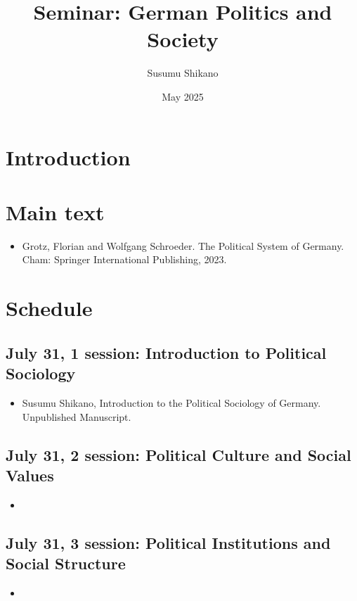 \documentclass[11p,a4]{article}
\title{Seminar: German Politics and Society}
\author{Susumu  Shikano}
\date{May 2025}
\begin{document}
\maketitle

\section{Introduction}

\section{Main text}

\begin{itemize}
    \item Grotz, Florian and Wolfgang Schroeder. The Political System of Germany. Cham: Springer International Publishing, 2023.
\end{itemize}

\section{Schedule}

\subsection*{July 31, 1 session: Introduction to Political Sociology}
				
				\begin{itemize}
				    \item Susumu Shikano, Introduction to the Political Sociology of Germany. Unpublished Manuscript.
				\end{itemize}
				
\subsection*{July 31, 2 session: Political Culture and Social Values}				

                \begin{itemize}
                    \item \citet{Pickel02012023}
                \end{itemize}
				
				
\subsection*{July 31, 3 session: Political Institutions and Social Structure}				
				\begin{itemize}
                    \item \cite{Schmidt02042016}
				\end{itemize}
				
\end{document}
